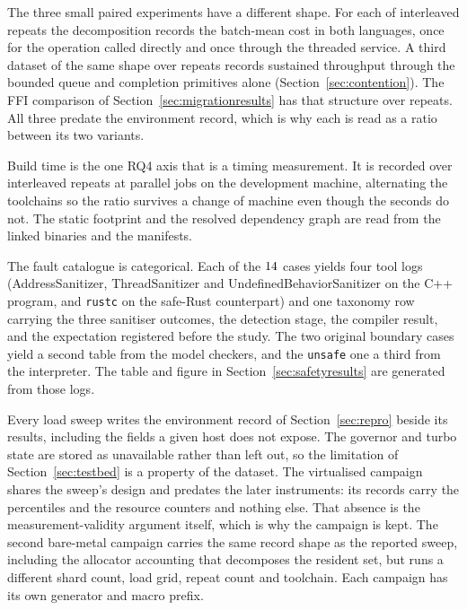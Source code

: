 \documentclass[english,oneside,a4paper,censored,csm,software-track-2020]{HYthesisML}
\begin{document}
\begin{appendices}
The three small paired experiments have a different shape. For each of \BudgetRepeats{}
interleaved repeats the decomposition records the batch-mean cost in both languages, once for
the operation called directly and once through the threaded service. A third dataset of the same
shape over \ContentionRepeats{} repeats records sustained throughput through the bounded queue and
completion primitives alone (Section~\ref{sec:contention}). The FFI comparison of
Section~\ref{sec:migrationresults} has that structure over \FfiOpRepeats{} repeats. All three
predate the environment record, which is why each is read as a ratio between its two variants.

Build time is the one RQ4 axis that is a timing measurement. It is recorded over
\AdoptRepeats{} interleaved repeats at \AdoptJobs{} parallel jobs on the development machine,
alternating the toolchains so the ratio survives a change of machine even though the seconds do
not. The static footprint and the resolved dependency graph are read from the linked binaries
and the manifests.

The fault catalogue is categorical. Each of the $14$ cases yields four tool logs
(AddressSanitizer, ThreadSanitizer and UndefinedBehaviorSanitizer on the C++ program, and
\texttt{rustc} on the safe-Rust counterpart) and one taxonomy row carrying the three sanitiser
outcomes, the detection stage, the compiler result, and the expectation registered before the
study. The two original boundary cases yield a second table from the model checkers, and the
\texttt{unsafe} one a third from the interpreter. The table and figure in
Section~\ref{sec:safetyresults} are generated from those logs.

Every load sweep writes the environment record of Section~\ref{sec:repro} beside its results,
including the fields a given host does not expose. The governor and turbo state are stored as
unavailable rather than left out, so the limitation of Section~\ref{sec:testbed} is a property
of the dataset. The virtualised campaign shares the sweep's design and predates the later
instruments: its records carry the percentiles and the resource counters and nothing else. That
absence is the measurement-validity argument itself, which is why the
campaign is kept. The second bare-metal campaign carries the same record shape as the reported
sweep, including the allocator accounting that decomposes the
resident set, but runs a different shard count, load grid, repeat count and toolchain. Each
campaign has its own generator and macro prefix.


\end{appendices}
\end{document}
